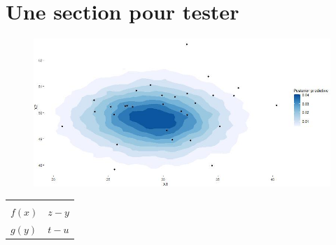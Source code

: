  \section{Une section pour tester}

\begin{figure}[h!]
  \begin{center}
      \includegraphics[scale=0.4]{density-predictive-full-X.jpeg}
  \end{center}
  \end{figure}

  \begin{table}[h!]
\begin{tabular}{|l|l|}
\hline \\
$f(x)$ & $z-y$ \\
$g(y)$ & $t-u$ \\
\hline
\end{tabular}
  \end{table}